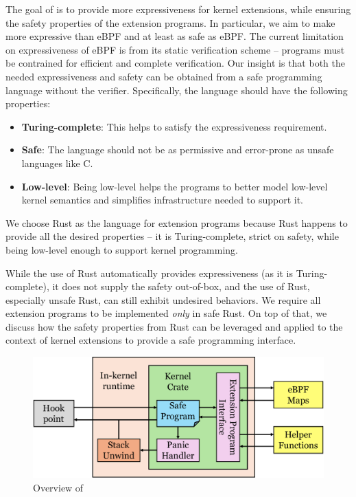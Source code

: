 The goal of \projname{} is to provide more expressiveness for kernel extensions,
    while ensuring the safety properties of the extension programs.
In particular, we aim to make \projname{} more expressive than eBPF and at least
    as safe as eBPF.
The current limitation on expressiveness of eBPF is from its static
    verification scheme -- programs must be contrained for efficient and
    complete verification.
Our insight is that both the needed expressiveness and safety can be obtained
    from a safe programming language without the verifier.
Specifically, the language should have the following properties:
\begin{itemize}
    \item \textbf{Turing-complete}: This helps to satisfy the expressiveness
        requirement.
    \item \textbf{Safe}: The language should not be as permissive and
        error-prone as unsafe languages like C.
    \item \textbf{Low-level}: Being low-level helps the programs to better
        model low-level kernel semantics and simplifies infrastructure needed
        to support it.
\end{itemize}
We choose Rust as the language for extension programs because Rust happens to
    provide all the desired properties -- it is Turing-complete, strict on
    safety, while being low-level enough to support kernel programming.

While the use of Rust automatically provides expressiveness (as it is
    Turing-complete), it does not supply the safety out-of-box, and the use of
    Rust, especially unsafe Rust, can still exhibit undesired behaviors.
We require all extension programs to be implemented \textit{only} in safe Rust.
On top of that, we discuss how the safety properties from Rust can be leveraged
    and applied to the context of kernel extensions to provide a safe
    programming interface.

\begin{figure}
    \includegraphics[width=1.0\linewidth]{figs/overview.pdf}
    \centering
    \vspace{-10pt}
    \caption{Overview of \projname{}}
    \label{fig:rex-overview}
    \vspace{-10pt}
\end{figure}

